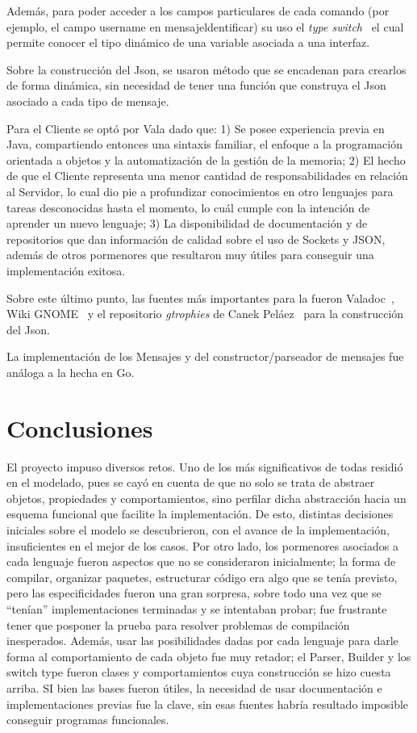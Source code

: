 \documentclass[11pt, a4paper]{article}
\begin{document}
Además, para poder acceder a los campos particulares de cada comando (por ejemplo, el campo username en mensajeldentificar) su uso el \textit{type switch}~\cite{gocomposite} el cual permite conocer el tipo dinámico de una variable asociada a una interfaz.

Sobre la construcción del Json, se usaron método que se encadenan para crearlos de forma dinámica, sin necesidad de tener una función que construya el Json asociado a cada tipo de mensaje.

Para el Cliente se optó por Vala dado que: 1) Se posee experiencia previa en Java, compartiendo entonces una sintaxis familiar, el enfoque a la programación orientada a objetos y la automatización de la gestión de la memoria; 2) El hecho de que el Cliente representa una menor cantidad de responsabilidades en relación al Servidor, lo cual dio pie a profundizar conocimientos en otro lenguajes para tareas desconocidas hasta el momento, lo cuál cumple con la intención de aprender un nuevo lenguaje; 3) La disponibilidad de documentación y de repositorios que dan información de calidad sobre el uso de Sockets y JSON, además de otros pormenores que resultaron muy útiles para conseguir una implementación exitosa.

Sobre este último punto, las fuentes más importantes para la fueron Valadoc~\cite{valadoc}, Wiki GNOME~\cite{gnomewiki} y el repositorio \textit{gtrophies} de Canek Peláez~\cite{gtrophies} para la construcción del Json.

La implementación de los Mensajes y del constructor/parseador de mensajes fue análoga a la hecha en Go.

\section*{Conclusiones}

El proyecto impuso diversos retos. Uno de los más significativos de todas residió en el modelado, pues se cayó en cuenta de que no solo se trata de abstraer objetos, propiedades y comportamientos, sino perfilar dicha abstracción hacia un esquema funcional que facilite la implementación. De esto, distintas decisiones iniciales sobre el modelo se descubrieron, con el avance de la implementación, insuficientes en el mejor de los casos. Por otro lado, los pormenores asociados a cada lenguaje fueron aspectos que no se consideraron inicialmente; la forma de compilar, organizar paquetes, estructurar código era algo que se tenía previsto, pero las especificidades fueron una gran sorpresa, sobre todo una vez que se ``tenían'' implementaciones terminadas y se intentaban probar; fue frustrante tener que posponer la prueba para resolver problemas de compilación inesperados. Además, usar las posibilidades dadas por cada lenguaje para darle forma al comportamiento de cada objeto fue muy retador; el Parser, Builder y los switch type fueron clases y comportamientos cuya construcción se hizo cuesta arriba. SI bien las bases fueron útiles, la necesidad de usar documentación e implementaciones previas fue la clave, sin esas fuentes habría resultado imposible conseguir programas funcionales.
\end{document}
